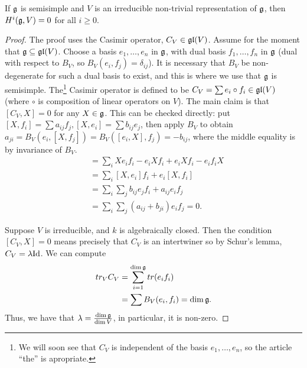  \begin{theorem}[Whitehead] \label{lec12Whitehead} 
   If $\mathfrak{g}$ is semisimple and $V$ is an irreducible non-trivial representation of $\mathfrak{g}$,
   then $H^i(\mathfrak{g},V)=0$ for all $i\ge 0$.
 \end{theorem}
 \begin{proof}
  The proof uses the Casimir operator, $C_V \in \mathfrak{gl}(V)$.
  Assume for the moment that $\mathfrak{g}\subseteq \mathfrak{gl}(V)$. Choose a basis $e_1,\dots, e_n$ in
  $\mathfrak{g}$, with dual basis $f_1,\dots, f_n$ in $\mathfrak{g}$ (dual with respect to $B_V$, so
  $B_V(e_i,f_j)=\delta_{ij}$).  It is necessary that $B_V$ be non-degenerate for such
  a dual basis to exist, and this is where we use that $\mathfrak{g}$ is semisimple.
  The\footnote{We will soon see that $C_V$ is independent of the basis $e_1,\dots,
  e_n$, so the article ``the'' is apropriate.} Casimir operator is defined to be $C_V
  = \sum e_i \circ f_i \in \mathfrak{gl}(V)$ (where $\circ$ is composition of linear operators
  on $V$). The main claim is that $[C_V,X]=0$ for any $X\in \mathfrak{g}$. This can be checked
  directly: put $[X,f_i]=\sum a_{ij} f_j, [X,e_i] = \sum b_{ij} e_j$, then apply $B_V$
  to obtain $a_{ji} = B_V(e_i,[X,f_j]) = B_V([e_i,X],f_j) = -b_{ij}$, where the middle
  equality is by invariance of $B_V$.
   \begin{align*}
   [X, C_V] &= \sum_i Xe_if_i - e_i Xf_i + e_i Xf_i - e_if_iX \\
        &= \sum_i [X, e_i] f_i + e_i [X,f_i] \\
        &= \sum_i \sum_j b_{ij} e_j f_i +  a_{ij} e_i f_j \\
        &= \sum_i\sum_j (a_{ij}+b_{ji})e_if_j = 0.
   \end{align*}


   Suppose $V$ is irreducible, and $k$ is algebraically closed. Then the condition
   $[C_V,X]=0$ means precisely that $C_V$ is an intertwiner so by Schur's
   lemma, $C_V=\lambda \mathrm{Id}$. We can compute
   \begin{align*}
     tr_V C_V &= \sum_{i=1}^{\dim \mathfrak{g}} tr(e_i f_i) \\
            &= \sum B_V(e_i,f_i) = \dim \mathfrak{g}.
   \end{align*}
   Thus, we have that $\lambda = \frac{\dim \mathfrak{g}}{\dim
   V}$, in particular, it is non-zero.


\end{proof}
